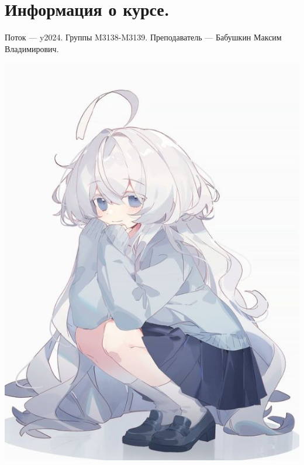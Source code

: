 \section{Информация о курсе.}

Поток — y2024.\newline
Группы M3138-M3139.\newline
Преподаватель --- Бабушкин Максим Владимирович.\par



\begin{center}
   \includegraphics[width=14cm]{assets/cute_girl.jpg}
\end{center}